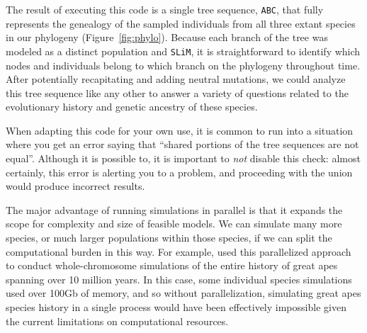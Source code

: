 \documentclass[12pt]{article}
\newcommand{\slim}[0]{\texttt{SLiM}\xspace}
\begin{document}
% 
% 
The result of executing this code is a single tree sequence,
\verb|ABC|,
that fully represents the genealogy of the sampled individuals from all three extant species in our phylogeny (Figure~\ref{fig:phylo}).
Because each branch of the tree was modeled as a distinct population and \slim, it is straightforward to identify which nodes and individuals belong
to which branch on the phylogeny throughout time.
After potentially recapitating and adding neutral mutations, we could analyze this tree sequence
like any other to answer a variety of questions related to the evolutionary history and genetic ancestry of these species.

When adapting this code for your own use, it is common to run into a situation
where you get an error saying that ``shared portions of the tree sequences are not equal''.
Although it is possible to, it is important to \emph{not} disable this check:
almost certainly, this error is alerting you to a problem,
and proceeding with the union would produce incorrect results.

The major advantage of running simulations in parallel is that it expands the scope for complexity and size of feasible models.
We can simulate many more species, or much larger
populations within those species, if we can split the computational burden in this way.
For example, \citet{rodrigues_shared_2024} used this parallelized approach to conduct
whole-chromosome simulations of the entire history of great apes spanning over 10 million years.
In this case, some individual species simulations used over 100Gb of memory,
and so without parallelization, simulating great apes species history in a single process would have been effectively impossible given the current limitations on computational resources.
\end{document}
